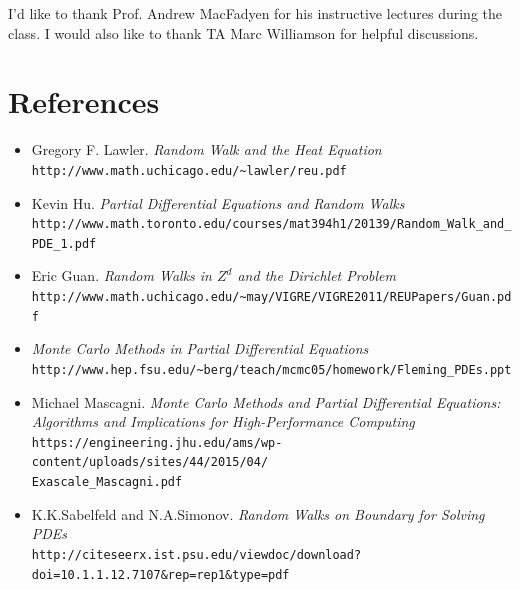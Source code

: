 \documentclass[aps, prl, preprint, groupedaddress]{revtex4-1}
\begin{document}
I'd like to thank Prof. Andrew MacFadyen for his instructive lectures during the class. I would also like to thank TA Marc Williamson for helpful discussions.

\section{References}

\begin{itemize}

    \item Gregory F. Lawler.
    \textit{Random Walk and the Heat Equation}
    \\\texttt{http://www.math.uchicago.edu/\~{}lawler/reu.pdf}

    \item Kevin Hu.
    \textit{Partial Differential Equations and Random Walks}
    \\\texttt{http://www.math.toronto.edu/courses/mat394h1/20139/Random\_Walk\_and\_PDE\_1.pdf}

    \item Eric Guan.
    \textit{Random Walks in $Z^d$ and the Dirichlet Problem}
    \\\texttt{http://www.math.uchicago.edu/\~{}may/VIGRE/VIGRE2011/REUPapers/Guan.pdf}

    \item
    \textit{Monte Carlo Methods in Partial Differential Equations}
    \\\texttt{http://www.hep.fsu.edu/\~{}berg/teach/mcmc05/homework/Fleming\_PDEs.ppt}

    \item Michael Mascagni.
    \textit{Monte Carlo Methods and Partial Differential Equations: Algorithms and Implications for High-Performance Computing}
    \\\texttt{https://engineering.jhu.edu/ams/wp-content/uploads/sites/44/2015/04/\\Exascale\_Mascagni.pdf}

    \item K.K.Sabelfeld and N.A.Simonov.
    \textit{Random Walks on Boundary for Solving PDEs}
    \\\texttt{http://citeseerx.ist.psu.edu/viewdoc/download?doi=10.1.1.12.7107\&rep=rep1\&type=pdf}
\end{itemize}
\end{document}
